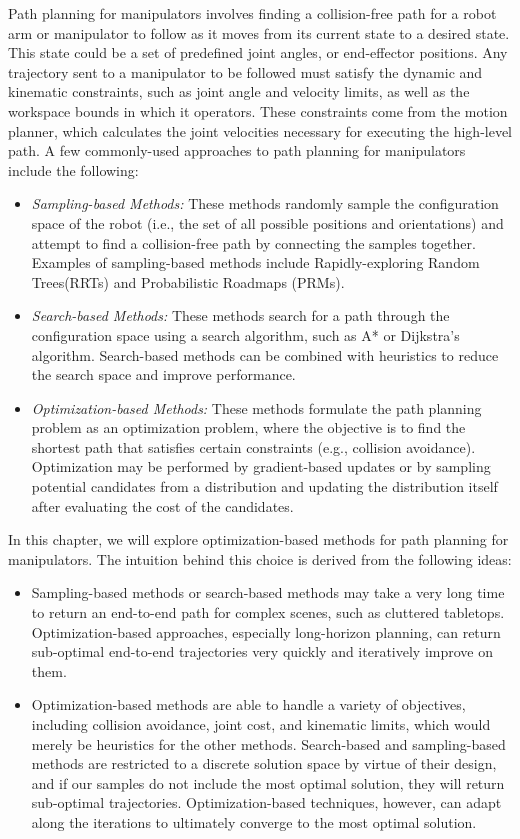 Path planning for manipulators involves finding a collision-free path for a robot arm or manipulator to follow as it moves from its current state to a desired state. This state could be a set of predefined joint angles, or end-effector positions. Any trajectory sent to a manipulator to be followed must satisfy the dynamic and kinematic constraints, such as joint angle and velocity limits, as well as the workspace bounds in which it operators. These constraints come from the motion planner, which calculates the joint velocities necessary for executing the high-level path. A few commonly-used approaches to path planning for manipulators include the following:

\begin{itemize}
    \item \textit{Sampling-based Methods:} These methods randomly sample the configuration space of the robot (i.e., the set of all possible positions and orientations) and attempt to find a collision-free path by connecting the samples together. Examples of sampling-based methods include Rapidly-exploring Random Trees(RRTs)\cite{RRT-og} and Probabilistic Roadmaps (PRMs)\cite{PRM}.
    \item \textit{Search-based Methods:} These methods search for a path through the configuration space using a search algorithm, such as A*\cite{A*} or Dijkstra's algorithm. Search-based methods can be combined with heuristics to reduce the search space and improve performance.
    \item \textit{Optimization-based Methods:} These methods formulate the path planning problem as an optimization problem, where the objective is to find the shortest path that satisfies certain constraints (e.g., collision avoidance). Optimization may be performed by gradient-based updates or by sampling potential candidates from a distribution and updating the distribution itself after evaluating the cost of the candidates. 

\end{itemize}

In this chapter, we will explore optimization-based methods for path planning for manipulators. The intuition behind this choice is derived from the following ideas:
\begin{itemize}
    \item Sampling-based methods or search-based methods may take a very long time to return an end-to-end path for complex scenes, such as cluttered tabletops. Optimization-based approaches, especially long-horizon planning, can return sub-optimal end-to-end trajectories very quickly and iteratively improve on them.
    \item Optimization-based methods are able to handle a variety of objectives, including collision avoidance, joint cost, and kinematic limits, which would merely be heuristics for the other methods. Search-based and sampling-based methods are restricted to a discrete solution space by virtue of their design, and if our samples do not include the most optimal solution, they will return sub-optimal trajectories. Optimization-based techniques, however, can adapt along the iterations to ultimately converge to the most optimal solution.
\end{itemize}

